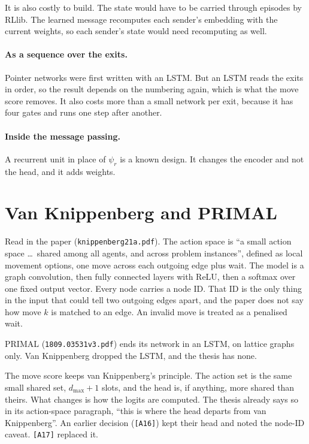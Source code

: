 \documentclass[11pt,a4paper]{article}
\begin{document}
It is also costly to build. The state would have to be carried through
episodes by RLlib. The learned message recomputes each sender's embedding
with the current weights, so each sender's state would need recomputing as
well.

\paragraph{As a sequence over the exits.} Pointer networks were first
written with an LSTM. But an LSTM reads the exits in order, so the result
depends on the numbering again, which is what the move score removes. It
also costs more than a small network per exit, because it has four gates and
runs one step after another.

\paragraph{Inside the message passing.} A recurrent unit in place of
$\psi_r$ is a known design. It changes the encoder and not the head, and it
adds weights.

\section{Van Knippenberg and PRIMAL}

Read in the paper (\texttt{knippenberg21a.pdf}). The action space is ``a
small action space \dots\ shared among all agents, and across problem
instances'', defined as local movement options, one move across each
outgoing edge plus wait. The model is a graph convolution, then fully
connected layers with ReLU, then a softmax over one fixed output vector.
Every node carries a node ID. That ID is the only thing in the input that
could tell two outgoing edges apart, and the paper does not say how move $k$
is matched to an edge. An invalid move is treated as a penalised wait.

PRIMAL (\texttt{1809.03531v3.pdf}) ends its network in an LSTM, on lattice
graphs only. Van Knippenberg dropped the LSTM, and the thesis has none.

The move score keeps van Knippenberg's principle. The action set is the same
small shared set, $d_{\max}+1$ slots, and the head is, if anything, more
shared than theirs. What changes is how the logits are computed. The thesis
already says so in its action-space paragraph, ``this is where the head
departs from van Knippenberg''. An earlier decision (\texttt{[A16]}) kept
their head and noted the node-ID caveat. \texttt{[A17]} replaced it.
\end{document}
